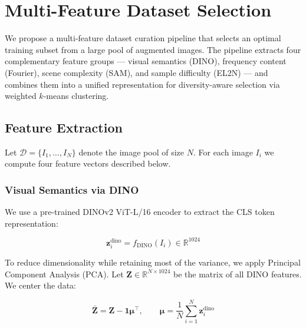 
\section{Multi-Feature Dataset Selection}
\label{sec:dataset_selection}

We propose a multi-feature dataset curation pipeline that selects an optimal
training subset from a large pool of augmented images.  The pipeline extracts
four complementary feature groups — visual semantics (DINO), frequency content
(Fourier), scene complexity (SAM), and sample difficulty (EL2N) — and combines
them into a unified representation for diversity-aware selection via weighted
$k$-means clustering.

\subsection{Feature Extraction}
\label{sec:features}

Let $\mathcal{D} = \{I_1, \dots, I_N\}$ denote the image pool of size $N$.
For each image $I_i$ we compute four feature vectors described below.

\subsubsection{Visual Semantics via DINO}
\label{sec:dino}

We use a pre-trained DINOv2 ViT-L/16 encoder to extract the CLS token
representation:

\begin{equation}
    \mathbf{z}_i^{\text{dino}} = f_{\text{DINO}}(I_i) \in \mathbb{R}^{1024}
\end{equation}

To reduce dimensionality while retaining most of the variance, we apply
Principal Component Analysis (PCA).  Let $\mathbf{Z} \in \mathbb{R}^{N \times 1024}$
be the matrix of all DINO features.  We center the data:

\begin{equation}
    \bar{\mathbf{Z}} = \mathbf{Z} - \mathbf{1}\boldsymbol{\mu}^{\top},
    \qquad \boldsymbol{\mu} = \frac{1}{N} \sum_{i=1}^{N} \mathbf{z}_i^{\text{dino}}
\end{equation}

